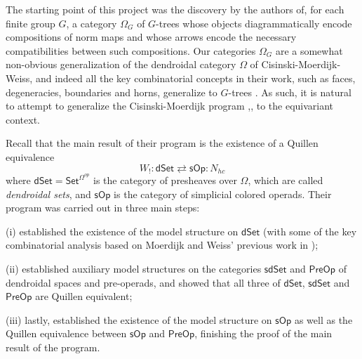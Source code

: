 \documentclass[a4paper,10pt
,draft
]{article}%
\begin{document}
The starting point of this project was the discovery by the authors of,
for each finite group $G$,
a category $\Omega_G$ of $G$-trees whose objects diagrammatically encode compositions of norm maps 
and whose arrows encode the necessary compatibilities between such compositions.
Our categories $\Omega_G$ are a somewhat non-obvious  generalization of the dendroidal category $\Omega$
of Cisinski-Moerdijk-Weiss, 
and indeed all the key combinatorial concepts in their work,
such as faces, degeneracies, boundaries and horns, generalize to $G$-trees \cite[\S 5,6]{Per17}.
As such, it is natural to attempt to generalize the 
Cisinski-Moerdijk program \cite{CM11},\cite{CM13a},\cite{CM13b} to the equivariant context. 

Recall that the main result of their program is the existence of a Quillen equivalence
\[
	W_{!} \colon \mathsf{dSet} 
		\rightleftarrows
	\mathsf{sOp}  \colon N_{hc} 
\]
where $\mathsf{dSet} = \mathsf{Set}^{\Omega^{op}} $
is the category of presheaves over $\Omega$, 
which are called \textit{dendroidal sets},
and 
$\mathsf{sOp}$ is the category of simplicial colored operads.
Their program was carried out in three main steps:
\begin{inparaenum}
	\item[(i)] \cite{CM11} established the existence of the model structure on $\mathsf{dSet}$
	(with some of the key combinatorial analysis based on Moerdijk and Weiss' previous work in \cite{MW09});
	\item[(ii)] \cite{CM13a} established auxiliary model structures on the categories $\mathsf{sdSet}$ and $\mathsf{PreOp}$
	of dendroidal spaces and pre-operads, and showed that all three of $\mathsf{dSet}$, $\mathsf{sdSet}$ and $\mathsf{PreOp}$ are Quillen equivalent;
	\item[(iii)] lastly, \cite{CM13b} established the existence of the model structure on $\mathsf{sOp}$ as well as the Quillen equivalence between $\mathsf{sOp}$ and $\mathsf{PreOp}$, finishing the proof of the main result of the program.
\end{inparaenum}
\end{document}
